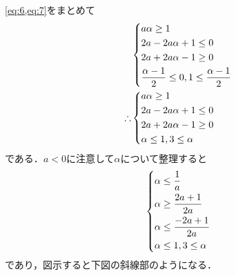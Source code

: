 \documentclass[../../main.tex]{subfiles}
\begin{document}
\cref{eq:6,eq:7}をまとめて
\begin{align}
  &
  \begin{dcases}
    a\alpha \ge 1 \\
    2a-2a\alpha+1 \le 0 \\
    2a+2a\alpha-1 \ge 0 \\
    \dfrac{\alpha-1}{2} \le 0, 1 \le \dfrac{\alpha-1}{2}
  \end{dcases} \\
  \therefore
  &
  \begin{dcases}
    a\alpha \ge 1 \\
    2a-2a\alpha+1 \le 0 \\
    2a+2a\alpha-1 \ge 0 \\
    \alpha \le 1, 3 \le \alpha
  \end{dcases}
\end{align}
である．$a<0$に注意して$\alpha$について整理すると
\begin{align}
  \begin{dcases}
    \alpha \le \dfrac{1}{a} \\
    \alpha \ge \dfrac{2a+1}{2a} \\
    \alpha \le \dfrac{-2a+1}{2a} \\
    \alpha \le 1, 3 \le \alpha
  \end{dcases}
\end{align}
であり，図示すると下図の斜線部のようになる．
\end{document}
